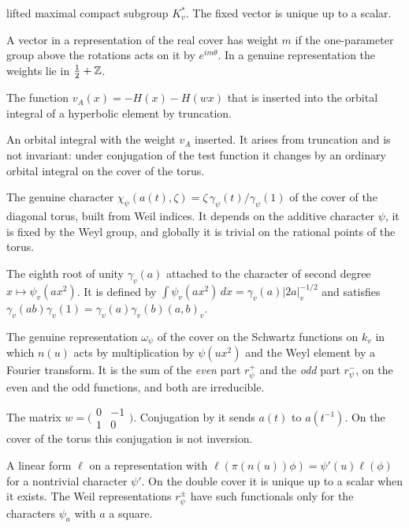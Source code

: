 \begin{description}
  lifted maximal compact subgroup $K_v^*$. The fixed vector is unique up
  to a scalar.
\item[Weight (of a vector).] A vector in a representation of the real
  cover has weight $m$ if the one-parameter group above the rotations
  acts on it by $e^{im\theta}$. In a genuine representation the weights
  lie in $\frac12+\mathbb{Z}$.
\item[Weight (of an orbital integral).] The function $v_A(x)=-H(x)-H(wx)$
  that is inserted into the orbital integral of a hyperbolic element by
  truncation.
\item[Weighted orbital integral.] An orbital integral with the weight
  $v_A$ inserted. It arises from truncation and is not invariant: under
  conjugation of the test function it changes by an ordinary orbital
  integral on the cover of the torus.
\item[Weil character.] The genuine character $\chi_\psi(a(t),\zeta)=
  \zeta\,\gamma_\psi(t)/\gamma_\psi(1)$ of the cover of the diagonal
  torus, built from Weil indices. It depends on the additive character
  $\psi$, it is fixed by the Weyl group, and globally it is trivial on
  the rational points of the torus.
\item[Weil index.] The eighth root of unity $\gamma_v(a)$ attached to the
  character of second degree $x\mapsto\psi_v(ax^2)$. It is defined by
  $\int\psi_v(ax^2)\,dx=\gamma_v(a)|2a|_v^{-1/2}$ and satisfies
  $\gamma_v(ab)\gamma_v(1)=\gamma_v(a)\gamma_v(b)(a,b)_v$.
\item[Weil representation.] The genuine representation $\omega_\psi$ of
  the cover on the Schwartz functions on $k_v$ in which $n(u)$ acts by
  multiplication by $\psi(ux^2)$ and the Weyl element by a Fourier
  transform. It is the sum of the \emph{even} part $r^+_\psi$ and the
  \emph{odd} part $r^-_\psi$, on the even and the odd functions, and both
  are irreducible.
\item[Weyl element.] The matrix $w=\bigl(\begin{smallmatrix}0&-1\\1&0
  \end{smallmatrix}\bigr)$. Conjugation by it sends $a(t)$ to
  $a(t^{-1})$. On the cover of the torus this conjugation is not
  inversion.
\item[Whittaker functional.] A linear form $\ell$ on a representation
  with $\ell(\pi(n(u))\phi)=\psi'(u)\ell(\phi)$ for a nontrivial
  character $\psi'$. On the double cover it is unique up to a scalar
  when it exists. The Weil representations $r^\pm_\psi$ have such functionals
  only for the characters $\psi_a$ with $a$ a square.
\end{description}
